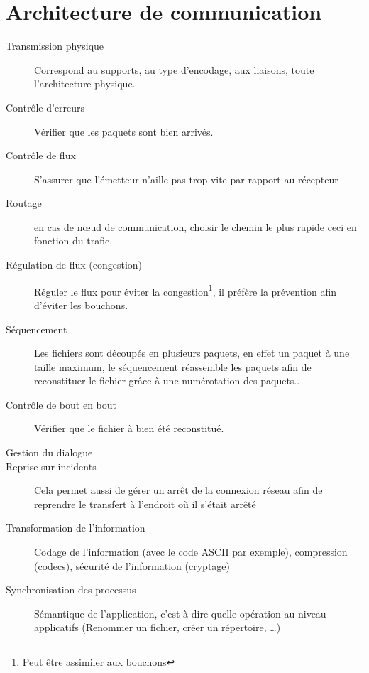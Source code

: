 \chapter{Architecture de communication}
	\begin{description}
		\item[Transmission physique] Correspond au supports, au type d'encodage, aux liaisons, toute l'architecture physique.
		\item[Contrôle d'erreurs]  Vérifier que les paquets sont bien arrivés.
		\item[Contrôle de flux]  S'assurer que l'émetteur n'aille pas trop vite par rapport au récepteur
		\item[Routage]  en cas de nœud de communication, choisir le chemin le plus rapide ceci en fonction du trafic. 
		\item[Régulation de flux (congestion)] Réguler le flux pour éviter la congestion\footnote{Peut être assimiler aux bouchons}, il préfère la prévention afin d'éviter les bouchons. 
		\item[Séquencement]  Les fichiers sont découpés en plusieurs paquets, en effet un paquet à une taille maximum, le séquencement réassemble les paquets afin de reconstituer le fichier grâce à une numérotation des paquets..
		\item[Contrôle de bout en bout] Vérifier que le fichier à bien été reconstitué. 
		\item[Gestion du dialogue] 
		\item[Reprise sur incidents]Cela permet aussi de gérer un arrêt de la connexion réseau afin de reprendre le transfert à l'endroit où il s'était arrêté
		\item[Transformation de l'information] Codage de l'information (avec le code ASCII par exemple), compression (codecs), sécurité de l'information (cryptage) 
		\item[Synchronisation des processus] Sémantique de l'application, c'est-à-dire quelle opération au niveau applicatifs (Renommer un fichier, créer un répertoire, \ldots)
	\end{description}

